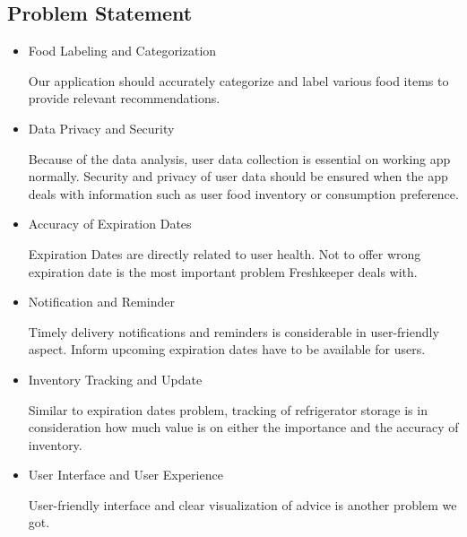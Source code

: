 \documentclass[conference]{IEEEtran}
\begin{document}
\subsection{Problem Statement}
\begin{itemize}
    \item Food Labeling and Categorization\par
    Our application should accurately categorize and label various food items to provide relevant recommendations. 
    \item Data Privacy and Security\par
    Because of the data analysis, user data collection is essential on working app normally. Security and privacy of user data should be ensured when the app deals with information such as user food inventory or consumption preference.
    \item Accuracy of Expiration Dates\par
    Expiration Dates are directly related to user health. Not to offer wrong expiration date is the most important problem Freshkeeper deals with.
    \item Notification and Reminder\par
    Timely delivery notifications and reminders is considerable in user-friendly aspect. Inform upcoming expiration dates have to be available for users.
    \item Inventory Tracking and Update\par
    Similar to expiration dates problem, tracking of refrigerator storage is in consideration how much value is on either the importance and the accuracy of inventory.
    \item User Interface and User Experience\par
    User-friendly interface and clear visualization of advice is another problem we got.
\end{itemize}
\end{document}
